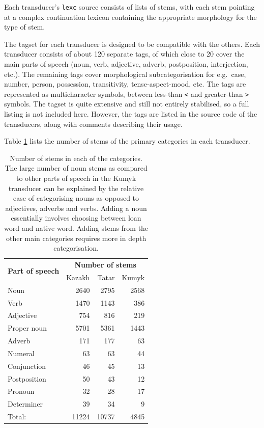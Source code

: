 \documentclass[a4paper,11pt,twocolumn]{article}
\begin{document}
Each transducer's \texttt{lexc} source consists of lists of stems, with each stem pointing at a complex continuation lexicon containing the appropriate morphology for the type of stem.  

The tagset for each transducer is designed to be compatible with the others.  Each transducer consists of about 120 separate tags, of which close to 20 cover the main parts of speech (noun, verb, adjective, adverb, postposition, interjection, etc.).  The remaining tags cover morphological subcategorisation for e.g.\ case, number, person, possession, transitivity, tense-aspect-mood, etc.  The tags are represented as multicharacter symbols, between less-than \texttt{<} and greater-than \texttt{>} symbols.  The tagset is quite extensive and still not entirely stabilised, so a full listing is not included here.  However, the tags are listed in the source code of the transducers, along with comments describing their usage.


Table \ref{table:stems} lists the number of stems of the primary categories in each transducer.

\begin{table}
\begin{center}
\begin{tabular}{lrrr}
		\toprule
\multirow{2}{*}{\textbf{Part of speech}} & \multicolumn{3}{c}{\textbf{Number of stems}} \\ \cline{2-4}
                        & Kazakh & Tatar & Kumyk \\
		\midrule
		Noun & 2640 & 2795 & 2568 \\
		Verb & 1470 & 1143 & 386 \\
		Adjective & 754 & 816 & 219 \\
		Proper noun & 5701 & 5361 & 1443 \\
		Adverb & 171 & 177 & 63 \\
		Numeral & 63 & 63 & 44 \\
		Conjunction & 46 & 45 & 13 \\
		Postposition & 50 & 43 & 12 \\
		Pronoun & 32 & 28 & 17 \\
		Determiner & 39 & 34 & 9 \\
		\midrule
		Total: & 11224 & 10737 & 4845 \\
		\bottomrule
\end{tabular}
 \caption{Number of stems in each of the categories. The large number of noun stems as compared
    to other parts of speech in the Kumyk transducer can be explained by the relative ease of 
    categorising nouns as opposed to adjectives, adverbs and verbs. Adding a noun essentially involves
    choosing between loan word and native word. Adding stems from the other main categories 
    requires more in depth categorisation.}
 \label{table:stems}
\end{center}

\end{table}
\end{document}
